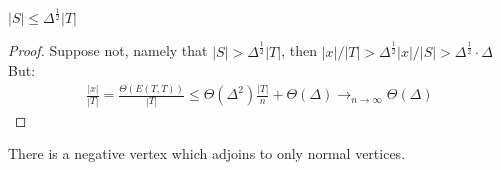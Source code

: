\begin{claim}
  $ |S| \le \Delta^{\frac{1}{2}}|T| $ 
\end{claim}
\begin{proof}
Suppose not, namely that $|S| > \Delta^{\frac{1}{2}}|T|$, then $|x|/|T| > \Delta^{\frac{1}{2}}|x|/|S| > \Delta^{\frac{1}{2}} \cdot \Delta $ But:  
\begin{equation*}
  \begin{split}
    \frac{|x|}{|T|} = \frac{\Theta \left(E(T,T) \right)}{|T|} \le \Theta(\Delta^{2})\frac{|T|}{n}  + \Theta(\Delta)  \rightarrow_{n\rightarrow \infty} \Theta(\Delta)
  \end{split}
\end{equation*}
\end{proof}
\begin{claim}
  There is a negative vertex which adjoins to only normal vertices. 
\end{claim}

